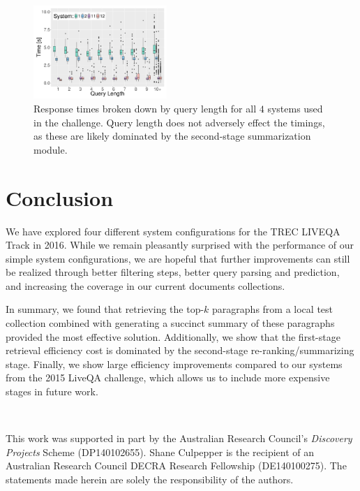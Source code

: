 \documentclass[a4paper,10pt,conference,compsocconf,final]{IEEEtran}
\newcommand{\myparagraph}[1]{\vspace*{1ex}\noindent{\textbf{#1.}}~}
\begin{document}
\begin{figure}[t]
\centering
\includegraphics[width=0.45\textwidth]{liveqa-actual-len.pdf}
\caption{Response times broken down by query length for all $4$
systems used in the challenge.
Query length does not adversely effect the timings, as these
are likely dominated by the second-stage summarization module.}
\label{fig:2016-lens}
\end{figure}


\section{Conclusion}

We have explored four different system configurations for the TREC
LIVEQA Track in 2016.
While we remain pleasantly surprised with the performance of our
simple system configurations, we are hopeful that further improvements 
can still be realized through better filtering steps, better query
parsing and prediction, and increasing the coverage in our current
documents collections.

In summary, we found that retrieving the top-$k$ paragraphs from a
local test collection combined with generating a succinct summary of
these paragraphs provided the most effective solution.
Additionally, we show that the first-stage retrieval efficiency cost
is dominated by the second-stage re-ranking/summarizing stage.
Finally, we show large efficiency improvements compared to our
systems from the 2015 LiveQA challenge, which allows us to include
more expensive stages in future work.

\myparagraph{Acknowledgment}

This work was supported in part by the Australian Research Council's
{\emph{Discovery Projects}} Scheme (DP140102655).
Shane Culpepper is the recipient of an Australian Research Council
DECRA Research Fellowship (DE140100275).
The statements made herein are solely the responsibility of the
authors.


% 
\balance
 

\end{document}

